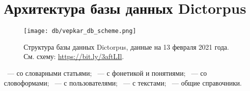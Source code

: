﻿\section{Архитектура базы данных Dictorpus} \label{sect_arch_db}

\begin{landscape}

\begin{figure}
    \centering
    \texttt{[image: db/vepkar\_db\_scheme.png]}
   \caption[Структура базы данных Dictorpus]{Структура базы данных Dictorpus, данные на 13 февраля 2021 года. См. схему: \url{https://bit.ly/3aftLIl}.} 
   \label{fig:vepkar_db_scheme}
\end{figure}

~--- со словарными статьями;
~--- с фонетикой и понятиями;
~--- со словоформами;
~--- с пользователями;
~--- с текстами;
~--- общие справочники.
\end{landscape}